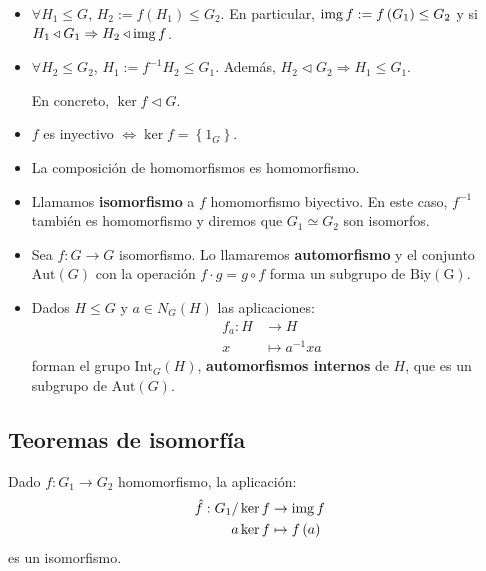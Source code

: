 \begin{obs}
\begin{itemize}
    \item $\forall H_1 \le G$, $H_2 := f\left( H_1 \right) \le G_2$. En particular, $\operatorname{img} f := f\left( G_1 \right) \le G_2$ y si $H_1 \triangleleft G_1 \Rightarrow H_2 \triangleleft \operatorname{img} f$.
    \item $\forall H_2 \le G_2$, $H_1 := f^{-1} H_2 \le G_1$. Además, $H_2 \triangleleft G_2 \Rightarrow H_1 \le G_1$.

    En concreto, $\ker f \triangleleft G$.

    \item $f$ es inyectivo $\Leftrightarrow \ker f = \left\{ 1_G \right\}$.

    \item La composición de homomorfismos es homomorfismo.
        
    \item Llamamos \textbf{isomorfismo} a $f$ homomorfismo biyectivo. En este caso, $f^{-1}$ también es homomorfismo y diremos que $G_1 \simeq G_2$ son isomorfos.
\end{itemize}
\end{obs}

\begin{ej}
\begin{itemize}
    \item Sea $f: G \rightarrow G$ isomorfismo. Lo llamaremos \textbf{automorfismo} y el conjunto $\mathrm{Aut}\left( G \right)$ con la operación $f \cdot g = g \circ f$ forma un subgrupo de $\mathrm{Biy\left( G \right)}$.

    \item Dados $H \le G$ y $a \in N_G\left( H \right)$ las aplicaciones:
    \begin{align*}
        f_a : H &\rightarrow H\\
        x &\mapsto a^{-1} x a
    \end{align*}
    forman el grupo $\mathrm{Int}_G\left( H \right)$, \textbf{automorfismos internos} de $H$, que es un subgrupo de $\mathrm{Aut}\left( G \right)$.
\end{itemize}
\end{ej}

\subsection{Teoremas de isomorfía}
\begin{theo}
Dado $f: G_1 \rightarrow G_2$ homomorfismo, la aplicación:
\begin{align*}
    \hat{f}: G_1 / \ker f &\rightarrow \operatorname{img} f\\
    a \ker f &\mapsto f\left( a \right)
\end{align*}
es un isomorfismo.
\end{theo}

